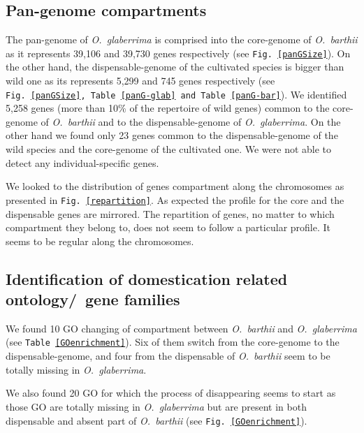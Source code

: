 \documentclass[10pt,letterpaper]{article}
\begin{document}
  \subsection{Pan-genome compartments}
  The pan-genome of \emph{O.~glaberrima} is comprised into the core-genome of \emph{O.~barthii} as it represents 39,106 and 39,730 genes respectively (see \texttt{Fig.~\ref{panGSize}}). On the other hand, the dispensable-genome of the cultivated species is bigger than wild one as its represents 5,299 and 745 genes respectively (see \texttt{Fig.~\ref{panGSize}, Table \ref{panG-glab} and Table \ref{panG-bar}}).
  We identified 5,258 genes (more than 10\% of the repertoire of wild genes) common to the core-genome of \emph{O.~barthii} and to the dispensable-genome of \emph{O.~glaberrima}.  On the other hand we found only 23 genes common to the dispensable-genome of the wild species and the core-genome of the cultivated one. We were not able to detect any individual-specific genes.
  
  We looked to the distribution of genes compartment along the chromosomes as presented in \texttt{Fig.~\ref{repartition}}. As expected the profile for the core and the dispensable genes are mirrored. The repartition of genes, no matter to which compartment they belong to, does not seem to follow a particular profile. It seems to be regular along the chromosomes.
  
  \subsection{Identification of domestication related ontology/~gene families}
  We found 10 GO changing of compartment between \emph{O.~barthii} and \emph{O.~glaberrima} (see \texttt{Table~\ref{GOenrichment}}). Six of them switch from the core-genome to the dispensable-genome, and four from the dispensable of \emph{O.~barthii} seem to be totally missing in \emph{O.~glaberrima}.
  
  We also found 20 GO for which the process of disappearing seems to start as those GO are totally missing in \emph{O.~glaberrima} but are present in both dispensable and absent part of \emph{O.~barthii} (see \texttt{Fig.~\ref{GOenrichment}}).
  
\end{document}
